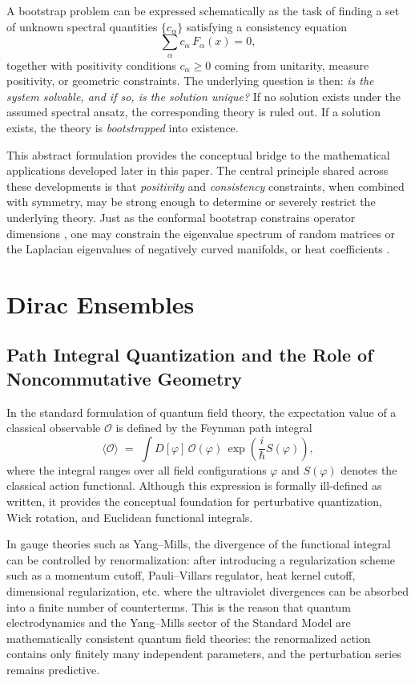 \documentclass[11pt]{article}
\theoremstyle{plain}
\begin{document}
A bootstrap problem can be expressed schematically as the task of finding a set of unknown spectral quantities $\{c_\alpha\}$ satisfying a consistency equation
\[
\sum_{\alpha} c_\alpha\, F_\alpha(x) = 0,
\]
together with positivity conditions $c_\alpha \ge 0$ coming from unitarity, measure positivity, or geometric constraints. The underlying question is then: \emph{is the system solvable, and if so, is the solution unique?} If no solution exists under the assumed spectral ansatz, the corresponding theory is ruled out. If a solution exists, the theory is \emph{bootstrapped} into existence.

This abstract formulation provides the conceptual bridge to the mathematical applications developed later in this paper. The central principle shared across these developments is that \emph{positivity} and \emph{consistency} constraints, when combined with symmetry, may be strong enough to determine or severely restrict the underlying theory. Just as the conformal bootstrap constrains operator dimensions \cite{BPZ1984,RRTV}, one may constrain the eigenvalue spectrum of random matrices or the Laplacian eigenvalues of negatively curved manifolds, or heat coefficients \cite{bootstraps,bootstraps berenstein,Bon1,Bon2,hessam2022bootstrapping,Khalkhali2022}.





\section{Dirac Ensembles}
\subsection{Path Integral Quantization and the Role of Noncommutative Geometry}
\label{sec:path-integral-ncg}

In the standard formulation of quantum field theory, the expectation value of a classical observable
$\mathcal{O}$ is defined by the Feynman path integral
\[
\langle \mathcal{O} \rangle \;=\; \int D[\varphi] \, \mathcal{O}(\varphi)\, 
\exp\!\left( \frac{i}{\hbar} S(\varphi)\right),
\]
where the integral ranges over all field configurations $\varphi$ and $S(\varphi)$ denotes the classical action functional. 
Although this expression is formally ill-defined as written, it provides the conceptual foundation for perturbative
quantization, Wick rotation, and Euclidean functional integrals.

In gauge theories such as Yang--Mills, the divergence of the functional integral can be controlled by 
renormalization: after introducing a regularization scheme  such as a momentum cutoff, Pauli--Villars regulator, heat kernel
cutoff, dimensional regularization, etc. where the ultraviolet divergences can be absorbed into a finite number of
counterterms. This is the reason that quantum electrodynamics and the Yang--Mills sector of the Standard Model
are mathematically consistent quantum field theories: the renormalized action contains only finitely many
independent parameters, and the perturbation series remains predictive.
\end{document}

